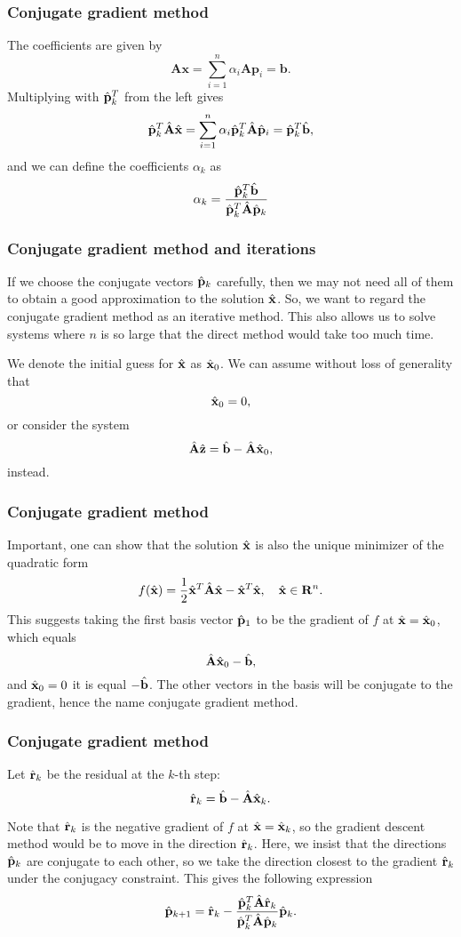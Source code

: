 \documentclass[compress]{beamer}
\begin{document}
\frame
{
  \frametitle{Conjugate gradient method}
\begin{small}
{\scriptsize
The coefficients are given by
\[
    \mathbf{A}\mathbf{x} = \sum^{n}_{i=1} \alpha_i \mathbf{A} \mathbf{p}_i = \mathbf{b}.
\]
Multiplying with $\hat{\bf {p}}_k^T$  from the left gives
\[
  \hat{\bf {p}}_k^T \hat{\bf {A}}\hat{\bf {x}} = \sum^{n}_{i=1} \alpha_i\hat{\bf {p}}_k^T \hat{\bf {A}}\hat{\bf {p}}_i= \hat{\bf {p}}_k^T \hat{\bf {b}},
\]
and we can define the coefficients $\alpha_k$ as 
\[
    \alpha_k = \frac{\hat{\bf {p}}_k^T \hat{\bf {b}}}{\hat{\bf {p}}_k^T \hat{\bf {A}} \hat{\bf {p}}_k}
\] 
}
\end{small}
}

\frame
{
  \frametitle{Conjugate gradient method and iterations}
\begin{small}
{\scriptsize
If we choose the conjugate vectors $\hat{\bf {p}}_k$ carefully, 
then we may not need all of them to obtain a good approximation to the solution 
$\hat{\bf {x}}$. 
So, we want to regard the conjugate gradient method as an iterative method. 
This also allows us to solve systems where $n$ is so large that the direct 
method would take too much time.

We denote the initial guess for $\hat{\bf {x}}$ as $\hat{\bf {x}}_0$. 
We can assume without loss of generality that 
\[
\hat{\bf {x}}_0=0,
\]
or consider the system 
\[
\hat{\bf {A}}\hat{\bf {z}} = \hat{\bf {b}}-\hat{\bf {A}}\hat{\bf {x}}_0,
\]
instead.
}
\end{small}
}


\frame
{
  \frametitle{Conjugate gradient method}
\begin{small}
{\scriptsize
Important, one can show that the solution $\hat{\bf {x}}$ is also the unique minimizer of the quadratic form
\[
  f(\hat{\bf {x}}) = \frac{1}{2}\hat{\bf {x}}^T\hat{\bf {A}}\hat{\bf {x}} - \hat{\bf {x}}^T \hat{\bf {x}} , \quad \hat{\bf {x}}\in\mathbf{R}^n. 
\]
This suggests taking the first basis vector $\hat{\bf {p}}_1$ 
to be the gradient of $f$ at $\hat{\bf {x}}=\hat{\bf {x}}_0$, 
which equals 
\[
\hat{\bf {A}}\hat{\bf {x}}_0-\hat{\bf {b}},
\]
and 
$\hat{\bf {x}}_0=0$ it is equal $-\hat{\bf {b}}$.
The other vectors in the basis will be conjugate to the gradient, 
hence the name conjugate gradient method.
}
\end{small}
}


\frame
{
  \frametitle{Conjugate gradient method}
\begin{small}
{\scriptsize
Let  $\hat{\bf {r}}_k$ be the residual at the $k$-th step:
\[
\hat{\bf {r}}_k=\hat{\bf {b}}-\hat{\bf {A}}\hat{\bf {x}}_k.
\]

Note that $\hat{\bf {r}}_k$ is the negative gradient of $f$ at 
$\hat{\bf {x}}=\hat{\bf {x}}_k$, 
so the gradient descent method would be to move in the direction $\hat{\bf {r}}_k$. 
Here, we insist that the directions $\hat{\bf {p}}_k$ are conjugate to each other, 
so we take the direction closest to the gradient $\hat{\bf {r}}_k$  
under the conjugacy constraint. 
This gives the following expression
\[
\hat{\bf {p}}_{k+1}=\hat{\bf {r}}_k-\frac{\hat{\bf {p}}_k^T \hat{\bf {A}}\hat{\bf {r}}_k}{\hat{\bf {p}}_k^T\hat{\bf {A}}\hat{\bf {p}}_k} \hat{\bf {p}}_k.
\]
}
\end{small}
}
\end{document}
